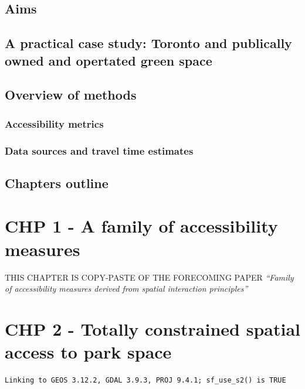 \documentclass[
11pt, %
oneside, %
english, %
singlespacing, %
]{macthesis} %
\begin{document}
\section{Aims}\label{aims}

\section{A practical case study: Toronto and publically owned and opertated green space}\label{a-practical-case-study-toronto-and-publically-owned-and-opertated-green-space}

\section{Overview of methods}\label{overview-of-methods}

\subsection{Accessibility metrics}\label{accessibility-metrics}

\subsection{Data sources and travel time estimates}\label{data-sources-and-travel-time-estimates}

\section{Chapters outline}\label{chapters-outline}

\chapter{CHP 1 - A family of accessibility measures}\label{chp-1---a-family-of-accessibility-measures}

THIS CHAPTER IS COPY-PASTE OF THE FORECOMING PAPER \emph{``Family of accessibility measures derived from spatial interaction principles''}

\chapter{CHP 2 - Totally constrained spatial access to park space}\label{chp-2---totally-constrained-spatial-access-to-park-space}

\begin{verbatim}
Linking to GEOS 3.12.2, GDAL 3.9.3, PROJ 9.4.1; sf_use_s2() is TRUE
\end{verbatim}
\end{document}
